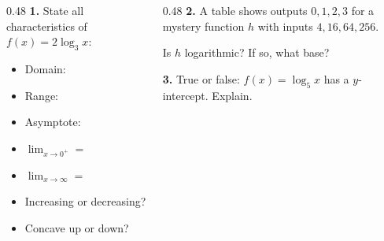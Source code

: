 \documentclass[aspectratio=169, 11pt]{beamer}
\begin{document}
\begin{frame}[t, plain]

  \begin{columns}[T]
    \begin{column}{0.48\textwidth}
      \textbf{1.} State all characteristics of $f(x) = 2\log_3 x$:
      \begin{itemize}
        \setlength{\itemsep}{6pt}
        \item Domain: \underline{\hspace{2.5cm}}
        \item Range: \underline{\hspace{2.5cm}}
        \item Asymptote: \underline{\hspace{2cm}}
        \item $\displaystyle\lim_{x\to 0^+} = $ \underline{\hspace{1.5cm}}
        \item $\displaystyle\lim_{x\to\infty} = $ \underline{\hspace{1.5cm}}
        \item Increasing or decreasing?
        \item Concave up or down?
      \end{itemize}
    \end{column}
    \begin{column}{0.48\textwidth}
      \textbf{2.} A table shows outputs $0, 1, 2, 3$ for a mystery function $h$ with
      inputs $4, 16, 64, 256$.

      \vspace{0.2cm}
      Is $h$ logarithmic? If so, what base?

      \vspace{0.8cm}
      \textbf{3.} True or false: $f(x) = \log_5 x$ has a $y$-intercept. Explain.
    \end{column}
  \end{columns}
\end{frame}
\end{document}
